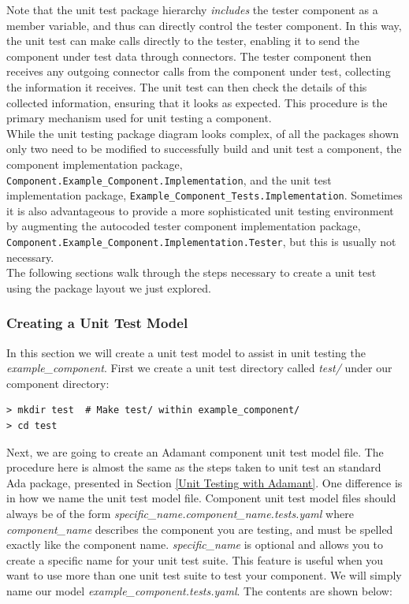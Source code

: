 Note that the unit test package hierarchy \textit{includes} the tester component as a member variable, and thus can directly control the tester component. In this way, the unit test can make calls directly to the tester, enabling it to send the component under test data through connectors. The tester component then receives any outgoing connector calls from the component under test, collecting the information it receives. The unit test can then check the details of this collected information, ensuring that it looks as expected. This procedure is the primary mechanism used for unit testing a component. \\

While the unit testing package diagram looks complex, of all the packages shown only two need to be modified to successfully build and unit test a component, the component implementation package, \texttt{Component.Example\_Component.Implementation}, and the unit test implementation package, \texttt{Example\_Component\_Tests.Implementation}. Sometimes it is also advantageous to provide a more sophisticated unit testing environment by augmenting the autocoded tester component implementation package, \texttt{Component.Example\_Component.Implementation.Tester}, but this is usually not necessary. \\

The following sections walk through the steps necessary to create a unit test using the package layout we just explored.

\subsubsection{Creating a Unit Test Model} \label{Creating a Unit Test Model}

In this section we will create a unit test model to assist in unit testing the \textit{example\_component}. First we create a unit test directory called \textit{test/} under our component directory:

\vspace{5mm} %
\begin{verbatim}
> mkdir test  # Make test/ within example_component/
> cd test
\end{verbatim}
\vspace{5mm} %

Next, we are going to create an Adamant component unit test model file. The procedure here is almost the same as the steps taken to unit test an standard Ada package, presented in Section \ref{Unit Testing with Adamant}. One difference is in how we name the unit test model file. Component unit test model files should always be of the form \textit{specific\_name.component\_name.tests.yaml} where \textit{component\_name} describes the component you are testing, and must be spelled exactly like the component name. \textit{specific\_name} is optional and allows you to create a specific name for your unit test suite. This feature is useful when you want to use more than one unit test suite to test your component. We will simply name our model \textit{example\_component.tests.yaml}. The contents are shown below:

